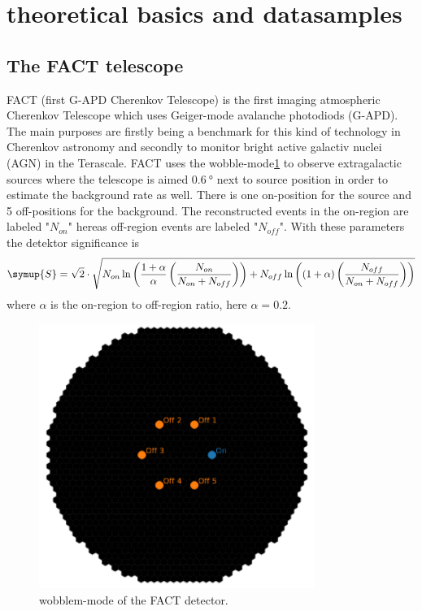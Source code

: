 \section{theoretical basics and datasamples}
\label{sec:theorie}

\subsection{The FACT telescope}
FACT (first G-APD Cherenkov Telescope) is the first imaging atmospheric Cherenkov Telescope which uses Geiger-mode avalanche photodiods (G-APD). The main purposes are firstly being a benchmark for this kind of technology in Cherenkov astronomy and secondly to monitor bright active galactiv nuclei (AGN) in the Terascale.
FACT uses the wobble-mode\ref{fig:wobble} to observe extragalactic sources where the telescope is aimed $\SI{0.6}{\degree}$ next to source position in order to estimate the background rate as well. There is one on-position for the source and 5 off-positions for the background.
The reconstructed events in the on-region are labeled "$N_{on}$" hereas off-region events are labeled "$N_{off}$".
With these parameters the detektor significance is
\begin{equation*}
  \symup{S} = \sqrt{2}\cdot \sqrt{N_{on} \ln\left( \frac{1 + \alpha}{\alpha} \left(  \frac{N_{on}}{N_{on} + N_{off}}\right)\right) +
  N_{off} \ln\left( (1 + \alpha) \left(\frac{N_{off}}{N_{on} + N_{off}}\right)\right)}
\end{equation*}
where $\alpha$ is the on-region to off-region ratio, here $\alpha = 0.2$.

\begin{figure}
  \centering
  \includegraphics[width=0.8\textwidth]{fact_pics/wobblemode.png}
  \caption{wobblem-mode of the FACT detector.}
  \label{fig:wobble}
\end{figure}


